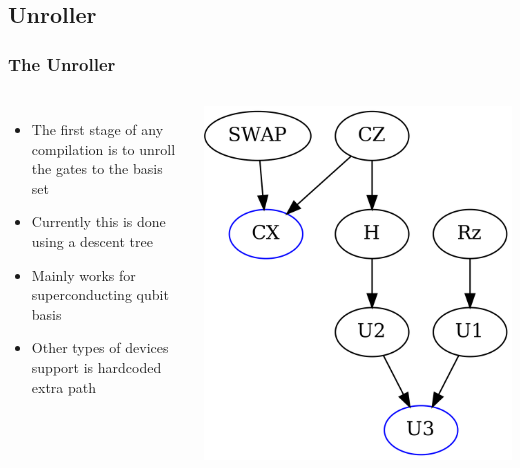 \documentclass[aspectratio=169,11pt,hyperref={colorlinks=true}]{beamer}
\begin{document}
\subsection{Unroller}
\begin{frame}
    \frametitle{The Unroller}
    \begin{columns}
        \begin{itemize}
            \item The first stage of any compilation is to unroll the gates to
                the basis set
            \item Currently this is done using a descent tree
            \item Mainly works for superconducting qubit basis
            \item Other types of devices support is hardcoded extra path
        \end{itemize}
            \includegraphics[width=\textwidth]{unroll_descent.png}
    \end{columns}
\end{frame}
\end{document}
